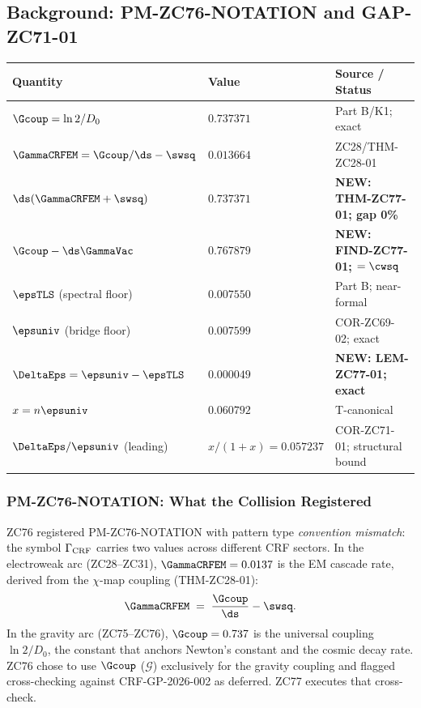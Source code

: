 \documentclass[12pt, a4paper]{article}
\begin{document}
\subsection{Background: PM-ZC76-NOTATION and GAP-ZC71-01}
\label{sec:background}

\begin{keybox}[title={Numerical Summary --- ZC77 (T-canonical)}]
{\small\renewcommand{\arraystretch}{1.25}
\begin{center}
\begin{tabular}{@{}p{5.5cm}p{2.3cm}p{4.2cm}@{}}
\toprule
\textbf{Quantity} & \textbf{Value} & \textbf{Source / Status} \\
\midrule
$\Gcoup = \ln2/D_0$                   & $0.737371$ & Part B/K1; exact \\
$\GammaCRFEM = \Gcoup/\ds - \swsq$    & $0.013664$ & ZC28/THM-ZC28-01 \\
$\ds(\GammaCRFEM + \swsq)$            & $0.737371$ & \textbf{NEW: THM-ZC77-01; gap 0\%} \\
$\Gcoup - \ds\GammaVac$               & $0.767879$ & \textbf{NEW: FIND-ZC77-01; $= \cwsq$} \\
$\epsTLS$ (spectral floor)            & $0.007550$ & Part B; near-formal \\
$\epsuniv$ (bridge floor)             & $0.007599$ & COR-ZC69-02; exact \\
$\DeltaEps = \epsuniv - \epsTLS$      & $0.000049$ & \textbf{NEW: LEM-ZC77-01; exact} \\
$x = n\epsuniv$                       & $0.060792$ & T-canonical \\
$\DeltaEps/\epsuniv$ (leading)        & $x/(1+x) = 0.057237$
  & COR-ZC71-01; structural bound \\
\bottomrule
\end{tabular}
\end{center}}
\end{keybox}

\subsubsection{PM-ZC76-NOTATION: What the Collision Registered}

ZC76 registered PM-ZC76-NOTATION with pattern type \emph{convention mismatch}:
the symbol $\Gamma_{\rm CRF}$ carries two values across different CRF sectors.
In the electroweak arc (ZC28--ZC31), $\GammaCRFEM = 0.0137$ is the EM
cascade rate, derived from the $\chi$-map coupling (THM-ZC28-01):
\[
  \GammaCRFEM \;=\; \frac{\Gcoup}{\ds} - \swsq.
\]
In the gravity arc (ZC75--ZC76), $\Gcoup = 0.737$ is the universal coupling
$\ln2/D_0$, the constant that anchors Newton's constant and the cosmic
decay rate. ZC76 chose to use $\Gcoup$ ($\mathcal{G}$) exclusively for the
gravity coupling and flagged cross-checking against CRF-GP-2026-002 as
deferred. ZC77 executes that cross-check.
\end{document}
